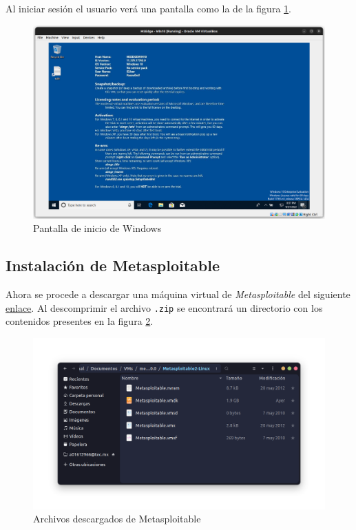 \documentclass{article}
\begin{document}
            Al iniciar sesión el usuario verá una pantalla como la de la figura \ref{fig:windows-init}.
            \begin{figure}[!htbp]
                \centering
                \includegraphics[scale=0.2]{img/windows-init.png}
                \caption{Pantalla de inicio de Windows}
                \label{fig:windows-init}
            \end{figure}

        \subsection{Instalación de Metasploitable}

            Ahora se procede a descargar una máquina virtual de \emph{Metasploitable} del siguiente \href{https://sourceforge.net/projects/metasploitable/}{enlace}. Al descomprimir el archivo \texttt{.zip} se encontrará un directorio con los contenidos presentes en la figura \ref{fig:meta-download}.
            \begin{figure}[!htbp]
                \centering
                \includegraphics[scale=0.2]{img/meta-download.png}
                \caption{Archivos descargados de Metasploitable}
                \label{fig:meta-download}
            \end{figure}
\end{document}
